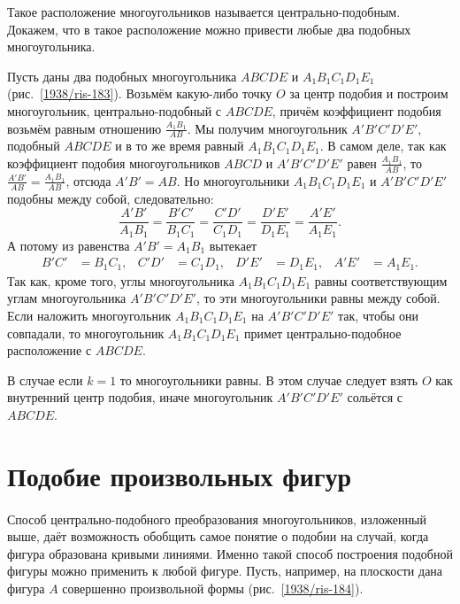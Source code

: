 \documentclass[oneside]{book}
\begin{document}
{\sloppy

Такое расположение многоугольников называется центрально-подобным. 
Докажем, что в такое расположение можно привести любые два подобных многоугольника.

Пусть даны два подобных многоугольника $ABCDE$ и $A_1B_1C_1D_1E_1$ (рис.~\ref{1938/ris-183}).
Возьмём какую-либо точку $O$ за центр подобия и построим многоугольник, центрально-подобный  с $ABCDE$, причём коэффициент подобия возьмём равным отношению $\frac{A_1B_1}{AB}$.
Мы получим многоугольник $A'B'C'D'E'$, подобный $ABCDE$ и в то же время равный $A_1B_1C_1D_1E_1$.
В самом деле, так как коэффициент подобия многоугольников $ABCD$ и $A'B'C'D'E'$ равен $\frac{A_1B_1}{AB}$, то $\frac{A'B'}{AB}=\frac{A_1B_1}{AB}$, отсюда $A'B'=AB$.
Но многоугольники $A_1B_1C_1D_1E_1$ и $A'B'C'D'E'$ подобны между собой, следовательно:
\[\frac{A'B'}{A_1B_1}=\frac{B'C'}{B_1C_1}=\frac{C'D'}{C_1D_1}=\frac{D'E'}{D_1E_1}=\frac{A'E'}{A_1E_1}.\]
А потому из равенства $A'B'=A_1B_1$ вытекает 
\begin{align*}
B'C'&=B_1C_1,&
C'D'&=C_1D_1,&
D'E'&=D_1E_1,&
A'E'&=A_1E_1.
\end{align*}
Так как, кроме того, углы многоугольника $A_1B_1C_1D_1E_1$ равны соответствующим углам многоугольника $A'B'C'D'E'$, то эти многоугольники равны между собой. 
Если наложить многоугольник $A_1B_1C_1D_1E_1$ на  $A'B'C'D'E'$ так, чтобы они совпадали, то многоугольник $A_1B_1C_1D_1E_1$ примет центрально-подобное расположение с $ABCDE$. 

В случае если $k=1$ то многоугольники равны.
В этом случае следует взять $O$ как внутренний центр подобия, иначе многоугольник $A'B'C'D'E'$ сольётся с $ABCDE$.


}

\section{Подобие произвольных фигур}

\paragraph{}\label{1938/177}
Способ центрально-подобного преобразования многоугольников, изложенный выше, даёт возможность обобщить самое понятие о подобии на случай, когда фигура образована кривыми линиями.
Именно такой способ построения подобной фигуры можно применить к любой фигуре.
Пусть, например, на плоскости дана фигура $A$ совершенно произвольной формы (рис.~\ref{1938/ris-184}).
\end{document}
